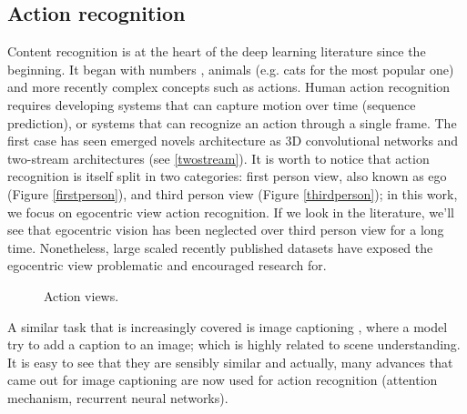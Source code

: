 \documentclass[12pt, a4paper]{report}
\begin{document}
			\subsection*{Action recognition}
				Content recognition is at the heart of the deep learning literature since the beginning. It began with numbers \cite{fukushima1981neocognitron,lecun1998gradient}, animals (e.g. cats for the most popular one) and more recently complex concepts such as actions.
				Human action recognition requires developing systems that can capture motion over time (sequence prediction), or systems that can recognize an action through a single frame.
				The first case has seen emerged novels architecture as 3D convolutional networks \cite{ji20123d} and two-stream architectures \cite{sudhakaran2019lsta,wang2016temporal,ye2019two} (see \ref{twostream}).
				It is worth to notice that action recognition is itself split in two categories: first person view, also known as \gls{ego} (Figure \ref{firstperson}), and third person view (Figure \ref{thirdperson}); in this work, we focus on egocentric view action recognition.
				If we look in the literature, we'll see that egocentric vision has been neglected over third person view for a long time.
				Nonetheless, large scaled recently published datasets have exposed the egocentric view problematic and encouraged research for.
				\begin{figure}[h!]
					\centering
					\hfill
					\caption{Action views.}
				\end{figure}
				A similar task that is increasingly covered is image captioning \cite{xu2015show}, where a model try to add a caption to an image; which is highly related to scene understanding.
				It is easy to see that they are sensibly similar and actually, many advances that came out for image captioning are now used for action recognition (attention mechanism, recurrent neural networks).
\end{document}
